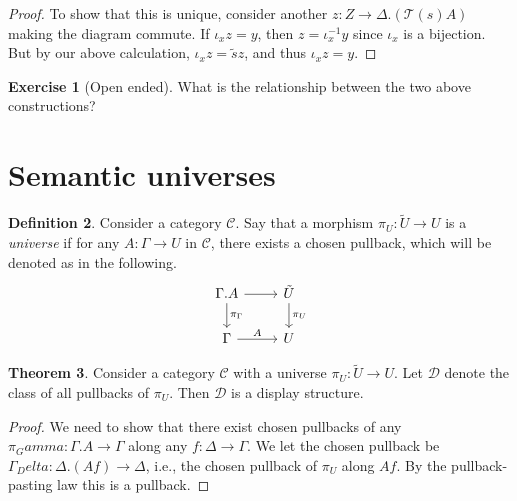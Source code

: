 \documentclass{article}
\theoremstyle{definition}
\newtheorem{definition}{Definition}[section]
\newtheorem{theorem}[definition]{Theorem}
\newtheorem{exercise}[definition]{Exercise}
\newcommand{\types}{\mathcal T}
\newcommand{\C}{\mathcal C}
\newcommand{\D}{\mathcal D}
\begin{document}
\begin{proof}
    
    To show that this is unique, consider another $z : Z \to \Delta. (\types(s) A)$ making the diagram commute. If $\iota_x z = y$, then $z = \iota_x^{-1} y$ since $\iota_x$ is a bijection. But by our above calculation, $\iota_x z = \tilde s z$, and thus $\iota_x z = y$.
\end{proof}

\begin{exercise}[Open ended]
    What is the relationship between the two above constructions?
\end{exercise}

\section{Semantic universes}

\begin{definition}
    Consider a category $\C$. Say that a morphism $\pi_U : \tilde{U} \to U$ is a \emph{universe} if for any $A: \Gamma \to U$ in $\C$, there exists a chosen pullback, which will be denoted as in the following.
    \[
         \begin{tikzcd}
             \Gamma.A \ar[r," "] \ar[d,"\pi_\Gamma"] & \tilde{U} \ar[d,"\pi_U"]
             \\ 
             \Gamma \ar[r,"A"] & U 
         \end{tikzcd}
    \]
\end{definition}

\begin{theorem}
    Consider a category $\C$ with a universe $\pi_U : \tilde{U} \to U$. Let $\D$ denote the class of all pullbacks of $\pi_U$. Then $\D$ is a display structure.
\end{theorem}
\begin{proof}
    We need to show that there exist chosen pullbacks of any $\pi_Gamma : \Gamma. A \to \Gamma$ along any $f: \Delta \to \Gamma$. We let the chosen pullback be $\Gamma_Delta : \Delta. (A f) \to \Delta$, i.e., the chosen pullback of $\pi_U$ along $A f$. By the pullback-pasting law this is a pullback.
\end{proof}
\end{document}
